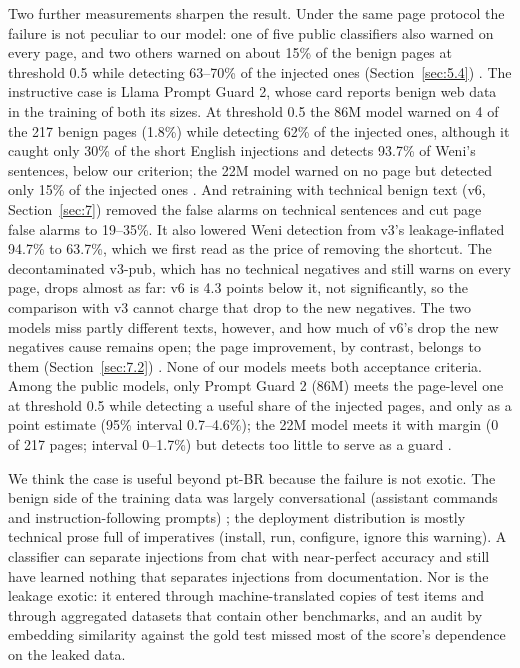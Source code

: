 \documentclass[11pt]{article}
\begin{document}
Two further measurements sharpen the result. Under the same page protocol the failure is not peculiar to our model: one of five public classifiers also warned on every page, and two others warned on about 15\% of the benign pages at threshold 0.5 while detecting 63–70\% of the injected ones (Section~\ref{sec:5.4})%
. The instructive case is Llama Prompt Guard 2, whose card reports benign web data in the training of both its sizes. At threshold 0.5 the 86M model warned on 4 of the 217 benign pages (1.8\%) while detecting 62\% of the injected ones, although it caught only 30\% of the short English injections and detects 93.7\% of Weni's sentences, below our criterion; the 22M model warned on no page but detected only 15\% of the injected ones%
. And retraining with technical benign text (v6, Section~\ref{sec:7}) removed the false alarms on technical sentences and cut page false alarms to 19–35\%. It also lowered Weni detection from v3's leakage-inflated 94.7\% to 63.7\%, which we first read as the price of removing the shortcut. The decontaminated v3-pub, which has no technical negatives and still warns on every page, drops almost as far: v6 is 4.3 points below it, not significantly, so the comparison with v3 cannot charge that drop to the new negatives. The two models miss partly different texts, however, and how much of v6's drop the new negatives cause remains open; the page improvement, by contrast, belongs to them (Section~\ref{sec:7.2})%
. None of our models meets both acceptance criteria. Among the public models, only Prompt Guard 2 (86M) meets the page-level one at threshold 0.5 while detecting a useful share of the injected pages, and only as a point estimate (95\% interval 0.7–4.6\%); the 22M model meets it with margin (0 of 217 pages; interval 0–1.7\%) but detects too little to serve as a guard%
.

We think the case is useful beyond pt-BR because the failure is not exotic. The benign side of the training data was largely conversational (assistant commands and instruction-following prompts)%
; the deployment distribution is mostly technical prose full of imperatives (install, run, configure, ignore this warning). A classifier can separate injections from chat with near-perfect accuracy and still have learned nothing that separates injections from documentation. Nor is the leakage exotic: it entered through machine-translated copies of test items and through aggregated datasets that contain other benchmarks, and an audit by embedding similarity against the gold test missed most of the score's dependence on the leaked data.
\end{document}

